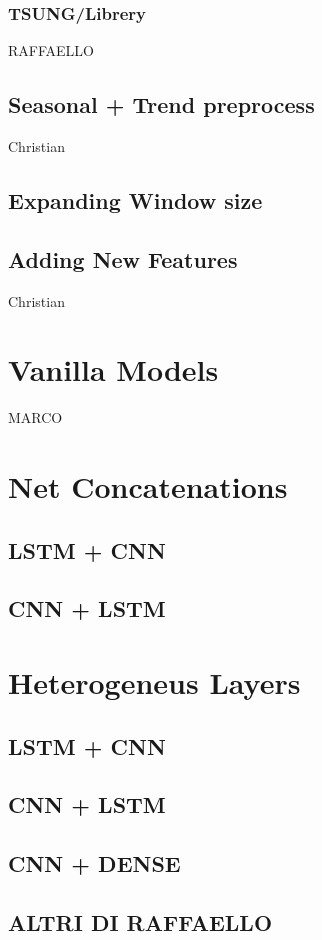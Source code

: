 \documentclass[11pt]{article}
\begin{document}
\subsubsection{TSUNG/Librery}
 RAFFAELLO
\subsection{Seasonal + Trend preprocess}
Christian
\subsection{Expanding Window size}
\subsection{Adding New Features}
Christian
\section{Vanilla Models}
MARCO
\section{Net Concatenations}
\subsection{LSTM + CNN}
\subsection{CNN + LSTM}

\section{Heterogeneus Layers}
\subsection{LSTM + CNN}
\subsection{CNN + LSTM}

\subsection{CNN + DENSE}
\subsection{ALTRI DI RAFFAELLO}
\end{document}

